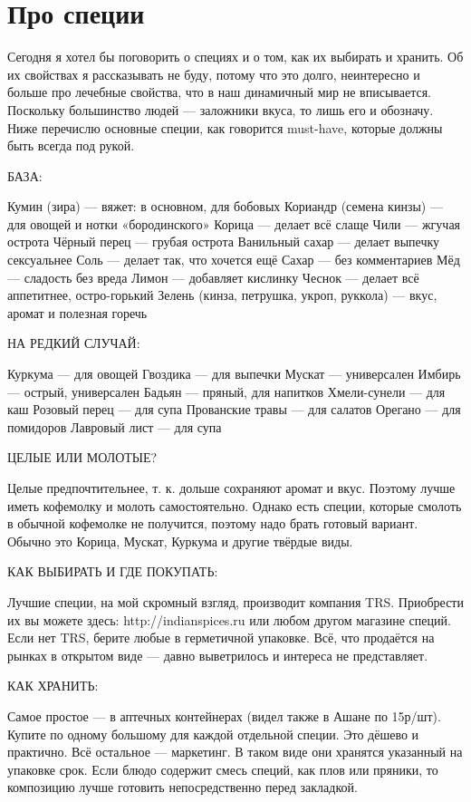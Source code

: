 \section{Про специи}
Сегодня я хотел бы поговорить о специях и о том, как их выбирать и хранить. Об их свойствах я рассказывать не буду, потому что это долго, неинтересно и больше про лечебные свойства, что в наш динамичный мир не вписывается. Поскольку большинство людей — заложники вкуса, то лишь его и обозначу. Ниже перечислю основные специи, как говорится must-have, которые должны быть всегда под рукой.

БАЗА:

Кумин (зира) — вяжет: в основном, для бобовых
Кориандр (семена кинзы) — для овощей и нотки «бородинского»
Корица — делает всё слаще
Чили — жгучая острота
Чёрный перец — грубая острота
Ванильный сахар — делает выпечку сексуальнее
Соль — делает так, что хочется ещё
Сахар — без комментариев
Мёд — сладость без вреда
Лимон — добавляет кислинку
Чеснок — делает всё аппетитнее, остро-горький
Зелень (кинза, петрушка, укроп, руккола) — вкус, аромат и полезная горечь

НА РЕДКИЙ СЛУЧАЙ:

Куркума — для овощей
Гвоздика — для выпечки
Мускат — универсален
Имбирь — острый, универсален
Бадьян — пряный, для напитков
Хмели-сунели — для каш
Розовый перец — для супа
Прованские травы — для салатов
Орегано — для помидоров
Лавровый лист — для супа

ЦЕЛЫЕ ИЛИ МОЛОТЫЕ?

Целые предпочтительнее, т. к. дольше сохраняют аромат и вкус. Поэтому лучше иметь кофемолку и молоть самостоятельно. Однако есть специи, которые смолоть в обычной кофемолке не получится, поэтому надо брать готовый вариант. Обычно это Корица, Мускат, Куркума и другие твёрдые виды.

КАК ВЫБИРАТЬ И ГДЕ ПОКУПАТЬ:

Лучшие специи, на мой скромный взгляд, производит компания TRS. Приобрести их вы можете здесь: http://indianspices.ru или любом другом магазине специй. Если нет TRS, берите любые в герметичной упаковке. Всё, что продаётся на рынках в открытом виде — давно выветрилось и интереса не представляет.

КАК ХРАНИТЬ:

Самое простое — в аптечных контейнерах (видел также в Ашане по 15р/шт). Купите по одному большому для каждой отдельной специи. Это дёшево и практично. Всё остальное — маркетинг. В таком виде они хранятся указанный на упаковке срок.
Если блюдо содержит смесь специй, как плов или пряники, то композицию лучше готовить непосредственно перед закладкой.


